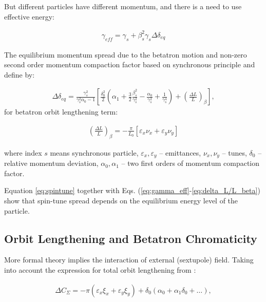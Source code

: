\documentclass[a4paper]{jpconf}
\begin{document}
\par But different particles have different momentum, and there is a need to use effective energy:

\begin{align}\label{eq:gamma_eff}
\gamma_{eff} = \gamma_{s}+\beta_{s}^2 \gamma_{s} \Delta \delta_{e q}
\end{align}

\par The equilibrium momentum spread due to the betatron motion and non-zero second order momentum compaction factor based on synchronous principle \cite{Decoherence} and define by:

\begin{align}
\label{eq:delta_eq}
\Delta \delta_{e q}=\frac{\gamma_s^2}{\gamma_s^2 \alpha_0-1} \left[\frac{\delta_0^2}{2}\left(\alpha_1+\frac{3}{2} \frac{\beta_s^2}{\gamma_s^2}-\frac{\alpha_0}{\gamma_s^2}+\frac{1}{\gamma_s^4}\right)+\left(\frac{\Delta L}{L}\right)_\beta\right],
\end{align}
for betatron orbit lengthening term:

\begin{align}\label{eq:delta_L/L_beta}
\left(\frac{\Delta L}{L}\right)_\beta=-\frac{\pi}{L_0}\left[\varepsilon_x \nu_x+\varepsilon_y \nu_y\right]
\end{align}

\par where index $s$ means synchronous particle, $\varepsilon_x, \varepsilon_y$ -- emittances, $\nu_x, \nu_y$ -- tunes, $\delta_0$ -- relative momentum deviation, $\alpha_0, \alpha_1$ -- two first orders of momentum compaction factor.

\par Equation \ref{eq:spintune} together with Eqs. (\ref{eq:gamma_eff}-\ref{eq:delta_L/L_beta}) show that spin-tune spread depends on the equilibrium energy level of the particle.

\subsection {Orbit Lengthening and Betatron Chromaticity}

\par More formal theory implies the interaction of external (sextupole) field. Taking into account the expression for total orbit lengthening from \cite{Lengthening}:

\begin{align}\label{eq:delta_C}
\Delta C_{\Sigma}=- \pi\left(\varepsilon_x \xi_x+ \varepsilon_y \xi_y\right)+\delta_0\left(\alpha_0+\alpha_1 \delta_0+\ldots\right),
\end{align}
\end{document}
